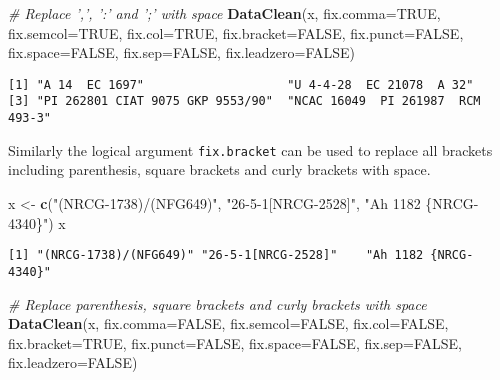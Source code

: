 \documentclass[
]{article}
\newenvironment{Shaded}{\begin{snugshade}}{\end{snugshade}}
\newcommand{\CommentTok}[1]{\textcolor[rgb]{0.56,0.35,0.01}{\textit{#1}}}
\newcommand{\DataTypeTok}[1]{\textcolor[rgb]{0.13,0.29,0.53}{#1}}
\newcommand{\KeywordTok}[1]{\textcolor[rgb]{0.13,0.29,0.53}{\textbf{#1}}}
\newcommand{\NormalTok}[1]{#1}
\newcommand{\OtherTok}[1]{\textcolor[rgb]{0.56,0.35,0.01}{#1}}
\newcommand{\StringTok}[1]{\textcolor[rgb]{0.31,0.60,0.02}{#1}}
\begin{document}
\begin{Shaded}
\begin{Highlighting}[]
\CommentTok{# Replace ',', ':' and ';' with space}
\KeywordTok{DataClean}\NormalTok{(x, }\DataTypeTok{fix.comma=}\OtherTok{TRUE}\NormalTok{, }\DataTypeTok{fix.semcol=}\OtherTok{TRUE}\NormalTok{, }\DataTypeTok{fix.col=}\OtherTok{TRUE}\NormalTok{,}
          \DataTypeTok{fix.bracket=}\OtherTok{FALSE}\NormalTok{, }\DataTypeTok{fix.punct=}\OtherTok{FALSE}\NormalTok{, }\DataTypeTok{fix.space=}\OtherTok{FALSE}\NormalTok{, }\DataTypeTok{fix.sep=}\OtherTok{FALSE}\NormalTok{,}
          \DataTypeTok{fix.leadzero=}\OtherTok{FALSE}\NormalTok{)}
\end{Highlighting}
\end{Shaded}

\begin{verbatim}
[1] "A 14  EC 1697"                    "U 4-4-28  EC 21078  A 32"        
[3] "PI 262801 CIAT 9075 GKP 9553/90"  "NCAC 16049  PI 261987  RCM 493-3"
\end{verbatim}

Similarly the logical argument \texttt{fix.bracket} can be used to
replace all brackets including parenthesis, square brackets and curly
brackets with space.

\begin{Shaded}
\begin{Highlighting}[]
\NormalTok{x <-}\StringTok{ }\KeywordTok{c}\NormalTok{(}\StringTok{"(NRCG-1738)/(NFG649)"}\NormalTok{, }\StringTok{"26-5-1[NRCG-2528]"}\NormalTok{, }\StringTok{"Ah 1182 \{NRCG-4340\}"}\NormalTok{)}
\NormalTok{x}
\end{Highlighting}
\end{Shaded}

\begin{verbatim}
[1] "(NRCG-1738)/(NFG649)" "26-5-1[NRCG-2528]"    "Ah 1182 {NRCG-4340}" 
\end{verbatim}

\begin{Shaded}
\begin{Highlighting}[]
\CommentTok{# Replace parenthesis, square brackets and curly brackets with space}
\KeywordTok{DataClean}\NormalTok{(x, }\DataTypeTok{fix.comma=}\OtherTok{FALSE}\NormalTok{, }\DataTypeTok{fix.semcol=}\OtherTok{FALSE}\NormalTok{, }\DataTypeTok{fix.col=}\OtherTok{FALSE}\NormalTok{,}
          \DataTypeTok{fix.bracket=}\OtherTok{TRUE}\NormalTok{,}
          \DataTypeTok{fix.punct=}\OtherTok{FALSE}\NormalTok{, }\DataTypeTok{fix.space=}\OtherTok{FALSE}\NormalTok{, }\DataTypeTok{fix.sep=}\OtherTok{FALSE}\NormalTok{, }\DataTypeTok{fix.leadzero=}\OtherTok{FALSE}\NormalTok{)}
\end{Highlighting}
\end{Shaded}
\end{document}
